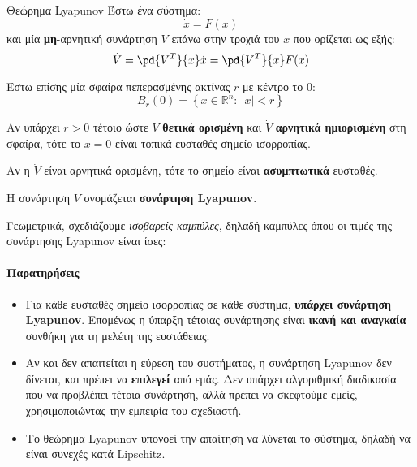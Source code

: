 \documentclass[11pt,a4paper,notitlepage,fleqn]{article}
\let\mytodo\todo
\renewcommand{\todo}[1]{\par\mytodo[inline,noline]{#1}}
\begin{document}
\begin{theorem}{Θεώρημα Lyapunov}{}
	Έστω ένα σύστημα: \[
	\dot x = F(x)
	\]
	και μία \textbf{μη}-αρνητική συνάρτηση \( V \) επάνω στην τροχιά του \( x \) που ορίζεται ως
	εξής:
	\[
	\dot V = \pd{V^T}{x} \dot x = \pd{V^T}{x} F(x)
	\]

	Έστω επίσης μία σφαίρα πεπερασμένης ακτίνας \( r \) με
	κέντρο το \(0\):
	\[
	B_r(0) = \left\lbrace x\in \mathbb R^n :\ |x|<r \right\rbrace
	\]

	Αν υπάρχει \( r > 0 \) τέτοιο ώστε \( V \) \textbf{θετικά ορισμένη}
	και \( \dot V \) \textbf{αρνητικά ημιορισμένη} στη σφαίρα, τότε το \( x = 0 \) είναι τοπικά
	ευσταθές σημείο ισορροπίας.

	Αν η \( \dot V \) είναι αρνητικά ορισμένη, τότε το σημείο είναι \textbf{ασυμπτωτικά} ευσταθές.

	Η συνάρτηση \( V \) ονομάζεται \textbf{συνάρτηση Lyapunov}.
\end{theorem}

Γεωμετρικά, σχεδιάζουμε \textit{ισοβαρείς καμπύλες}, δηλαδή καμπύλες όπου
οι τιμές της συνάρτησης Lyapunov είναι ίσες:
\todo{Graph 18}

\paragraph{Παρατηρήσεις}
\begin{itemize}
	\item Για κάθε ευσταθές σημείο ισορροπίας σε κάθε σύστημα, \textbf{υπάρχει
		συνάρτηση Lyapunov}. Επομένως η ύπαρξη τέτοιας συνάρτησης είναι
	\textbf{ικανή και αναγκαία} συνθήκη για τη μελέτη της ευστάθειας.
	\item Αν και δεν απαιτείται η εύρεση του συστήματος, η συνάρτηση
	Lyapunov δεν δίνεται, και πρέπει να \textbf{επιλεγεί} από εμάς. Δεν υπάρχει
	αλγοριθμική διαδικασία που να προβλέπει τέτοια συνάρτηση, αλλά πρέπει να
	σκεφτούμε εμείς, χρησιμοποιώντας την εμπειρία του σχεδιαστή.
	\item Το θεώρημα Lyapunov υπονοεί την απαίτηση να λύνεται
	το σύστημα, δηλαδή να είναι συνεχές κατά Lipschitz.
\end{itemize}

\end{document}
